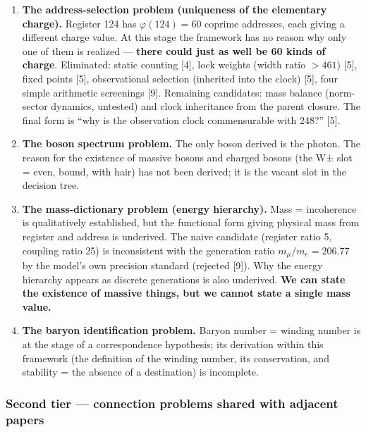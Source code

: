 \documentclass[
  a4paper,
]{article}
\providecommand{\tightlist}{%
  \setlength{\itemsep}{0pt}\setlength{\parskip}{0pt}}
\begin{document}
\begin{enumerate}
\def\labelenumi{\arabic{enumi}.}
\tightlist
\item
  \textbf{The address-selection problem (uniqueness of the elementary
  charge).} Register 124 has \(\varphi(124)=60\) coprime addresses, each
  giving a different charge value. At this stage the framework has no
  reason why only one of them is realized --- \textbf{there could just
  as well be 60 kinds of charge}. Eliminated: static counting {[}4{]},
  lock weights (width ratio \(>461\)) {[}5{]}, fixed points {[}5{]},
  observational selection (inherited into the clock) {[}5{]}, four
  simple arithmetic screenings {[}9{]}. Remaining candidates: mass
  balance (norm-sector dynamics, untested) and clock inheritance from
  the parent closure. The final form is ``why is the observation clock
  commensurable with 248?'' {[}5{]}.
\item
  \textbf{The boson spectrum problem.} The only boson derived is the
  photon. The reason for the existence of massive bosons and charged
  bosons (the W± slot = even, bound, with hair) has not been derived; it
  is the vacant slot in the decision tree.
\item
  \textbf{The mass-dictionary problem (energy hierarchy).} Mass =
  incoherence is qualitatively established, but the functional form
  giving physical mass from register and address is underived. The naive
  candidate (register ratio 5, coupling ratio 25) is inconsistent with
  the generation ratio \(m_\mu/m_e=206.77\) by the model's own precision
  standard (rejected {[}9{]}). Why the energy hierarchy appears as
  discrete generations is also underived. \textbf{We can state the
  existence of massive things, but we cannot state a single mass value.}
\item
  \textbf{The baryon identification problem.} Baryon number = winding
  number is at the stage of a correspondence hypothesis; its derivation
  within this framework (the definition of the winding number, its
  conservation, and stability = the absence of a destination) is
  incomplete.
\end{enumerate}

\subsubsection{Second tier --- connection problems shared with adjacent
papers}\label{second-tier-connection-problems-shared-with-adjacent-papers}
\end{document}
